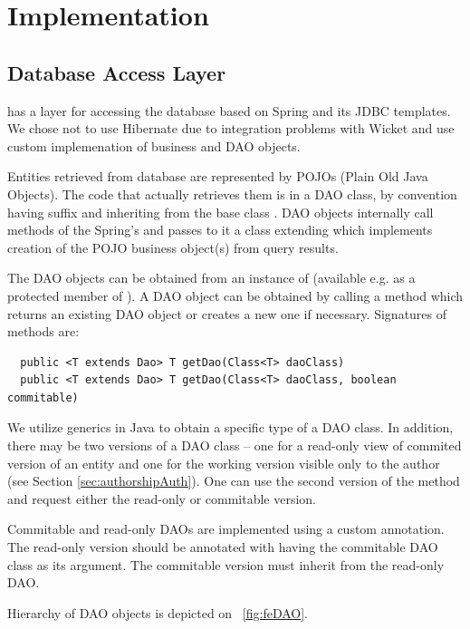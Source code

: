 \section{Implementation}

\subsection{Database Access Layer}
\FE has a layer for accessing the database based on Spring and its JDBC templates. We chose not to use Hibernate due to integration problems with Wicket and use custom implemenation of business and DAO objects.

Entities retrieved from database are represented by POJOs (Plain Old Java Objects). The code that actually retrieves them is in a DAO class, by convention having suffix  and inheriting from the base class . DAO objects internally call methods of the Spring's  and passes to it a class extending  which implements creation of the POJO business object(s) from query results.

The DAO objects can be obtained from an instance of  (available e.g. as a protected member of ). A DAO object can be obtained by calling a  method which returns an existing DAO object or creates a new one if necessary. Signatures of  methods are:

\begin{verbatim}
  public <T extends Dao> T getDao(Class<T> daoClass)
  public <T extends Dao> T getDao(Class<T> daoClass, boolean commitable)
\end{verbatim}

We utilize generics in Java to obtain a specific type of a DAO class. In addition, there may be two versions of a DAO class -- one for a read-only view of commited version of an entity and one for the working version visible only to the author (see Section \ref{sec:authorshipAuth}). One can use the second version of the  method and request either the read-only or commitable version.

Commitable and read-only DAOs are implemented using a custom  annotation. The read-only version should be annotated with  having the commitable DAO class as its argument. The commitable version must inherit from the read-only DAO.

Hierarchy of DAO objects is depicted on \figurename~\ref{fig:feDAO}.


